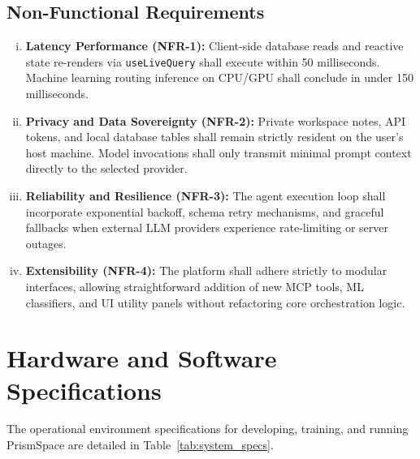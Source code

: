 \documentclass[12pt,a4paper]{report}
\begin{document}
\subsection{Non-Functional Requirements}
\begin{enumerate}[(i)]\setlength{\itemsep}{1.5pt}\setlength{\parsep}{0pt}\setlength{\topsep}{2pt}
    \item \textbf{Latency Performance (NFR-1):} Client-side database reads and reactive state re-renders via \texttt{useLiveQuery} shall execute within 50 milliseconds. Machine learning routing inference on CPU/GPU shall conclude in under 150 milliseconds.
    \item \textbf{Privacy and Data Sovereignty (NFR-2):} Private workspace notes, API tokens, and local database tables shall remain strictly resident on the user's host machine. Model invocations shall only transmit minimal prompt context directly to the selected provider.
    \item \textbf{Reliability and Resilience (NFR-3):} The agent execution loop shall incorporate exponential backoff, schema retry mechanisms, and graceful fallbacks when external LLM providers experience rate-limiting or server outages.
    \item \textbf{Extensibility (NFR-4):} The platform shall adhere strictly to modular interfaces, allowing straightforward addition of new MCP tools, ML classifiers, and UI utility panels without refactoring core orchestration logic.
\end{enumerate}

\section{Hardware and Software Specifications}
The operational environment specifications for developing, training, and running PrismSpace are detailed in Table~\ref{tab:system_specs}.
\end{document}
